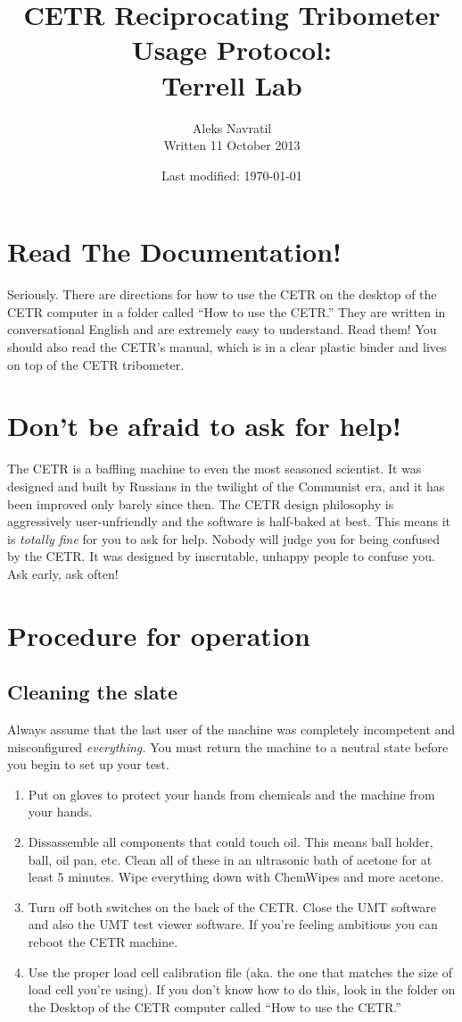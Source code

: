 \documentclass[10pt, letterpaper]{article}
\title{CETR Reciprocating Tribometer Usage Protocol: \\ Terrell Lab}
\author{Aleks Navratil \\ Written 11 October 2013}
\date{Last modified: \today}
\begin{document}
\maketitle
\tableofcontents
\newpage
\section{Read The Documentation!}

Seriously. There are directions for how to use the CETR on the desktop of the CETR computer in a folder called ``How to use the CETR.'' They are written in conversational English and are extremely easy to understand. Read them! You should also read the CETR's manual, which is in a clear plastic binder and lives on top of the CETR tribometer.

\section{Don't be afraid to ask for help!}
The CETR is a baffling machine to even the most seasoned scientist. It was designed and built by Russians in the twilight of the Communist era, and it has been improved only barely since then. The CETR design philosophy is aggressively user-unfriendly and the software is half-baked at best. This means it is \emph{totally fine} for you to ask for help. Nobody will judge you for being confused by the CETR. It was designed by inscrutable, unhappy people to confuse you. Ask early, ask often!

\section{Procedure for operation}
\subsection{Cleaning the slate}
Always assume that the last user of the machine was completely incompetent and misconfigured \emph{everything.} You must return the machine to a neutral state before you begin to set up your test.
\begin{enumerate}
\item Put on gloves to protect your hands from chemicals and the machine from your hands.

\item Dissassemble all components that could touch oil. This means ball holder, ball, oil pan, etc. Clean all of these in an ultrasonic bath of acetone for at least 5 minutes. Wipe everything down with ChemWipes and more acetone.

\item Turn off both switches on the back of the CETR. Close the UMT software and also the UMT test viewer software. If you're feeling ambitious you can reboot the CETR machine.

\item Use the proper load cell calibration file (aka. the one that matches the size of load cell you're using). If you don't know how to do this, look in the folder on the Desktop of the CETR computer called ``How to use the CETR.''
\end{enumerate}
\end{document}
